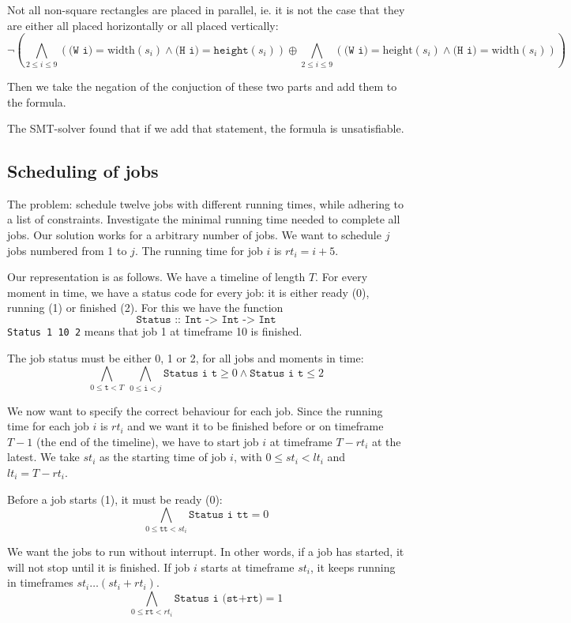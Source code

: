 \documentclass[12pt]{article}
\begin{document}
Not all non-square rectangles are placed in parallel, ie. it is not the case that they are either all placed horizontally or all placed vertically:
\[
\neg
\left(
\bigwedge_{2 \le i \le 9}
\left( 
\texttt{(W i)} = \text{width}(s_i) \wedge \texttt{(H i)} = \texttt{height}(s_i)
\right)
\oplus
\bigwedge_{2 \le i \le 9}
\left(
\texttt{(W i)} = \text{height}(s_i) \wedge \texttt{(H i)} = \text{width}(s_i)
\right)
\right)
\]

Then we take the negation of the conjuction of these two parts and add them to the formula.

The SMT-solver found that if we add that statement, the formula is unsatisfiable. 


\subsection*{Scheduling of jobs}
The problem: schedule twelve jobs with different running times, while adhering to a list of constraints.
Investigate the minimal running time needed to complete all jobs.
Our solution works for a arbitrary number of jobs.
We want to schedule $j$ jobs numbered from 1 to $j$.
The running time for job $i$ is $rt_i = i+5$.

Our representation is as follows.
We have a timeline of length $T$.
For every moment in time, we have a status code for every job: it is either ready (0), running (1) or finished (2). 
For this we have the function 
\[\texttt{Status :: Int -> Int -> Int}\]
\texttt{Status 1 10 2} means that job 1 at timeframe 10 is finished. 

The job status must be either 0, 1 or 2, for all jobs and moments in time:
\[ \bigwedge_{0 \le \texttt{t} < T} ~ \bigwedge_{0 \le \texttt{i} < j} \texttt{Status i t} \ge 0\wedge \texttt{Status i t} \le 2\]

We now want to specify the correct behaviour for each job. 
Since the running time for each job $i$ is $rt_i$ and we want it to be finished before or on timeframe $T-1$ (the end of the timeline), we have to start job $i$ at timeframe $T - rt_i$ at the latest.
We take $st_i$ as the starting time of job $i$, with $0 \le st_i < lt_i$ and $lt_i = T-rt_i$.

Before a job starts (1), it must be ready (0):
\[ \bigwedge_{0 \le \texttt{tt} < st_i} \texttt{Status i tt} = 0 \]

We want the jobs to run without interrupt.
In other words, if a job has started, it will not stop until it is finished. 
If job $i$ starts at timeframe $st_i$, it keeps running in timeframes $st_i \dots (st_i + rt_i)$.
\[ \bigwedge_{0 \le \texttt{rt} < rt_i} \texttt{Status i (st+rt)} = 1 \]
\end{document}
